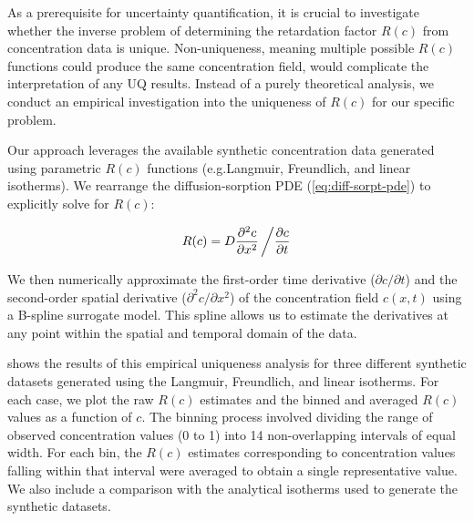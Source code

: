 As a prerequisite for uncertainty quantification, it is crucial to investigate whether the inverse problem of determining the retardation factor $R(c)$ from concentration data is unique. Non-uniqueness, meaning multiple possible $R(c)$ functions could produce the same concentration field, would complicate the interpretation of any UQ results. Instead of a purely theoretical analysis, we conduct an empirical investigation into the uniqueness of $R(c)$ for our specific problem.

Our approach leverages the available synthetic concentration data generated using parametric $R(c)$ functions (e.g.\@ Langmuir, Freundlich, and linear isotherms). We rearrange the diffusion-sorption PDE (\ref{eq:diff-sorpt-pde}) to explicitly solve for $R(c)$:

\begin{equation*}
    R(c) = D \frac{\partial^2 c}{\partial x^2} \left/ \frac{\partial c}{\partial t} \right .
\end{equation*}

We then numerically approximate the first-order time derivative ($\partial c / \partial t$) and the second-order spatial derivative ($\partial^2 c / \partial x^2$) of the concentration field $c(x,t)$ using a B-spline surrogate model. This spline allows us to estimate the derivatives at any point within the spatial and temporal domain of the data.

 shows the results of this empirical uniqueness analysis for three different synthetic datasets generated using the Langmuir, Freundlich, and linear isotherms. For each case, we plot the raw $R(c)$ estimates and the binned and averaged $R(c)$ values as a function of $c$. The binning process involved dividing the range of observed concentration values (0 to 1) into 14 non-overlapping intervals of equal width. For each bin, the $R(c)$ estimates corresponding to concentration values falling within that interval were averaged to obtain a single representative value. We also include a comparison with the analytical isotherms used to generate the synthetic datasets.

